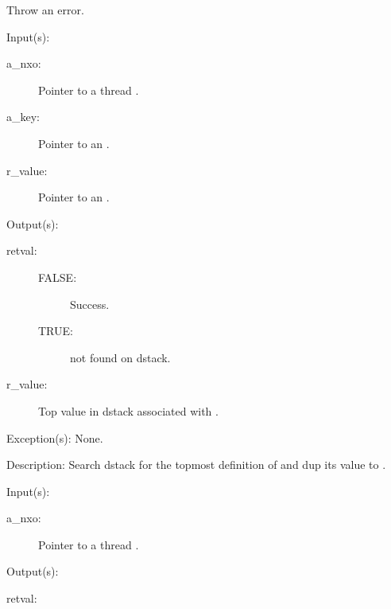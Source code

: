 \begin{capi}
\begin{capilist}
		Throw an error.
	\end{capilist}
\label{nxo_thread_dstack_search}
	\begin{capilist}
	\item[Input(s): ]
		\begin{description}\item[]
		\item[a\_nxo: ]
			Pointer to a thread .
		\item[a\_key: ]
			Pointer to an .
		\item[r\_value: ]
			Pointer to an .
		\end{description}
	\item[Output(s): ]
		\begin{description}\item[]
		\item[retval: ]
			\begin{description}\item[]
			\item[FALSE: ]
				Success.
			\item[TRUE: ]
				 not found on dstack.
			\end{description}
		\item[r\_value: ]
			Top value in dstack associated with .
		\end{description}
	\item[Exception(s): ] None.
	\item[Description: ]
		Search dstack for the topmost definition of  and
		dup its value to .
	\end{capilist}
\label{nxo_thread_currentlocking}
	\begin{capilist}
	\item[Input(s): ]
		\begin{description}\item[]
		\item[a\_nxo: ]
			Pointer to a thread \classname{nxo}.
		\end{description}
	\item[Output(s): ]
		\begin{description}\item[]
		\item[retval: ]

\end{description}
\end{capilist}
\end{capi}
